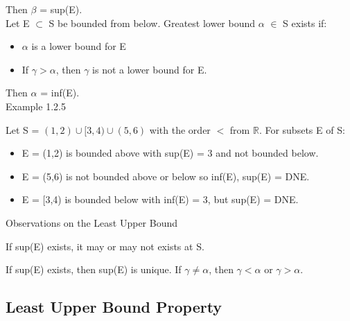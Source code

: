 	\hspace{2cm}
	Then $\beta$ = sup(E). \\

	\hspace{1cm}
	Let E $\subset$ S be bounded from below.
	Greatest lower bound $\alpha$ $\in$ S exists if:
	
	\begin{itemize}[leftmargin=2cm , itemsep=0.1cm]
		\item $\alpha$ is a lower bound for E

		\item If $\gamma > \alpha$, then $\gamma$ is not a lower bound for E.
	\end{itemize}

	\hspace{2cm}
	Then $\alpha$ = inf(E). \\

{ \color{purple} Example 1.2.5 }

	\hspace{1cm}
	Let S = $ (1,2) \cup [3,4) \cup (5,6) $ with the order $ < $ from $ \mathbb{R} $.
	For subsets E of S:

	\begin{itemize}[leftmargin=2cm, itemsep=0.1cm]
		\item E = (1,2) is bounded above with sup(E) = 3 and not bounded below.
	
		\item E = (5,6) is not bounded above or below so inf(E), sup(E) = DNE.
	
		\item E = [3,4) is bounded below with inf(E) = 3, but sup(E) = DNE. \\
	\end{itemize}

{ \color{blue} Observations on the Least Upper Bound }

	\hspace{1cm}
	If sup(E) exists, it may or may not exists at S.

	\hspace{1cm}
	If sup(E)  exists, then sup(E) is unique.
	If $ \gamma \neq \alpha $, then $ \gamma < \alpha $ or $ \gamma > \alpha $.




	
\subsection{Least Upper Bound Property}

